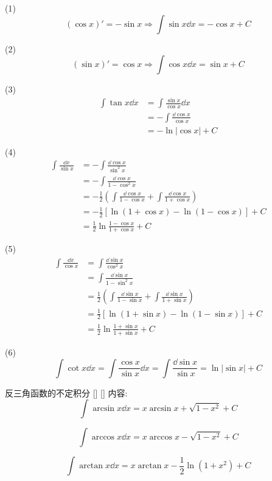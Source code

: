 \documentclass[UTF8]{ctexart}
\begin{document}
			\begin{prf}
				(1)\[(\cos x)'=-\sin x\Longrightarrow\int\sin x\dd x=-\cos x+C\]
				
				(2)\[(\sin x)'=\cos x\Longrightarrow\int\cos x\dd x=\sin x+C\]
				
				(3)\[
				\begin{aligned}
					\int\tan x\dd x
					& = \int\frac{\sin x}{\cos x}\dd x\\
					& = -\int\frac{\dd\cos x}{\cos x}\\
					& = -\ln|\cos x|+C
				\end{aligned}\]
				
				(4)\[
				\begin{aligned}
					\int\frac{\dd x}{\sin x}
					& = -\int\frac{\dd\cos x}{\sin^2x}\\
					& = -\int\frac{\dd\cos x}{1-\cos^2x}\\
					& = -\frac{1}{2}\left(\int\frac{\dd\cos x}{1-\cos x}+\int\frac{\dd\cos x}{1+\cos x}\right)\\
					& = -\frac{1}{2}[\ln(1+\cos x)-\ln(1-\cos x)]+C\\
					& = \frac{1}{2}\ln\frac{1-\cos x}{1+\cos x}+C
				\end{aligned}\]
				
				(5)\[
				\begin{aligned}
					\int\frac{\dd x}{\cos x}
					& = \int\frac{\dd\sin x}{\cos^2x}\\
					& = \int\frac{\dd\sin x}{1-\sin^2x}\\
					& = \frac{1}{2}\left(\int\frac{\dd\sin x}{1-\sin x}+\int\frac{\dd\sin x}{1+\sin x}\right)\\
					& = \frac{1}{2}[\ln(1+\sin x)-\ln(1-\sin x)]+C\\
					& = \frac{1}{2}\ln\frac{1+\sin x}{1+\sin x}+C
				\end{aligned}\]
				
				(6)\[\int\cot x\dd x=\int\frac{\cos x}{\sin x}\dd x=\int\frac{\dd\sin x}{\sin x}=\ln|\sin x|+C\]
                \end{prf}
			
				\begin{xmp}
			    []
			    {反三角函数的不定积分}
			    []
			    []
					内容: 
					\[ \int \arcsin x \dd x = x \arcsin x + \sqrt{1 - x^2} + C \]
					
					\[ \int \arccos x \dd x = x \arccos x - \sqrt{1 - x^2} + C \]
	
					\[ \int \arctan x \dd x = x \arctan x - \frac{1}{2} \ln(1 + x^2) + C \]
				\end{xmp}
								
\end{document}
